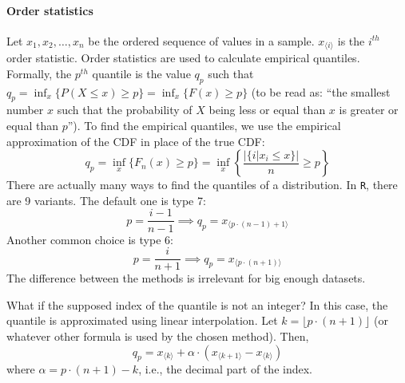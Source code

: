 \paragraph{Order statistics} Let $x_1, x_2, \ldots, x_n$ be the ordered sequence of values in a sample. $x_{\langle i \rangle}$ is the $i^{th}$ order statistic. Order statistics are used to calculate empirical quantiles. Formally, the $p^{th}$ quantile is the value $q_p$ such that $q_p = \inf_x \{ P(X \leq x) \geq p \} = \inf_x \{F(x) \geq p\}$ (to be read as: ``the smallest number $x$ such that the probability of $X$ being less or equal than $x$ is greater or equal than $p$''). To find the empirical quantiles, we use the empirical approximation of the CDF in place of the true CDF:
\begin{equation*}
    q_p = \inf_x \{ F_n(x) \geq p \} = \inf_x \left\{\frac{|\{i | x_i \leq x \}|}{n} \geq p \right\}
\end{equation*}   
There are actually many ways to find the quantiles of a distribution. In \texttt{R}, there are 9 variants. The default one is type 7:
\begin{equation*}
    p = \frac{i-1}{n-1} \implies q_p = x_{\langle p\cdot(n-1) + 1 \rangle}
\end{equation*}
Another common choice is type 6:
\begin{equation*}
    p = \frac{i}{n+1} \implies q_p = x_{\langle p \cdot (n+1) \rangle}
\end{equation*}
The difference between the methods is irrelevant for big enough datasets.

What if the supposed index of the quantile is not an integer? In this case, the quantile is approximated using linear interpolation. Let $k = \lfloor p \cdot (n+1) \rfloor$ (or whatever other formula is used by the chosen method). Then,
\begin{equation*}
    q_p = x_{\langle k \rangle} + \alpha \cdot (x_{\langle k+1 \rangle} - x_{\langle k \rangle})
\end{equation*}
where $\alpha = p \cdot (n+1) - k$, i.e., the decimal part of the index.

